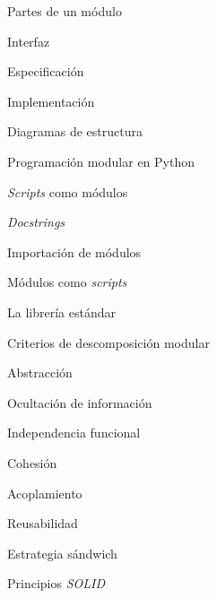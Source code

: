 \begin{longenum}
\begin{longenum}
\begin{longenum}
            \item Partes de un módulo
            \begin{longenum}
                \item Interfaz
                \begin{longenum}
                    \item Especificación
                \end{longenum}
                \item Implementación
            \end{longenum}
            \item Diagramas de estructura
        \end{longenum}
        \item Programación modular en Python
        \begin{longenum}
            \item \textit{Scripts} como módulos
            \begin{longenum}
                \item \textit{Docstrings}
            \end{longenum}
            \item Importación de módulos
            \item Módulos como \textit{scripts}
            \item La librería estándar
        \end{longenum}
        \item Criterios de descomposición modular
        \begin{longenum}
            \item Abstracción
            \item Ocultación de información
            \item Independencia funcional
            \begin{longenum}
                \item Cohesión
                \item Acoplamiento
            \end{longenum}
            \item Reusabilidad
            \begin{longenum}
                \item Estrategia sándwich
            \end{longenum}
            \item Principios \textit{SOLID}
        \end{longenum}

\end{longenum}
\end{longenum}
